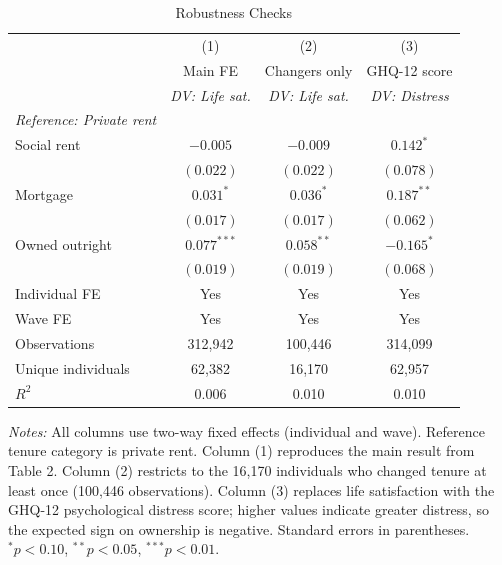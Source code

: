 \documentclass[12pt,a4paper]{article}
\begin{document}
\begin{table}[H]
\centering
\caption{Robustness Checks}
\label{tab:robust}
\begin{threeparttable}
\begin{tabular}{lccc}
\toprule
 & (1) & (2) & (3) \\
 & Main FE & Changers only & GHQ-12 score \\
 & \textit{DV: Life sat.} & \textit{DV: Life sat.} & \textit{DV: Distress} \\
\midrule
\textit{Reference: Private rent} & & & \\[0.3em]
Social rent
  & $-0.005$      & $-0.009$      & $0.142^{*}$  \\
  & $(0.022)$     & $(0.022)$     & $(0.078)$    \\[0.3em]
Mortgage
  & $0.031^{*}$   & $0.036^{*}$   & $0.187^{**}$ \\
  & $(0.017)$     & $(0.017)$     & $(0.062)$    \\[0.3em]
Owned outright
  & $0.077^{***}$ & $0.058^{**}$  & $-0.165^{*}$ \\
  & $(0.019)$     & $(0.019)$     & $(0.068)$    \\[0.5em]
Individual FE      & Yes     & Yes     & Yes     \\
Wave FE            & Yes     & Yes     & Yes     \\
\midrule
Observations       & 312{,}942 & 100{,}446 & 314{,}099 \\
Unique individuals & 62{,}382  & 16{,}170  & 62{,}957  \\
$R^{2}$            & 0.006     & 0.010     & 0.010     \\
\bottomrule
\end{tabular}
\begin{tablenotes}
\small
\item \textit{Notes:} All columns use two-way fixed effects (individual
and wave). Reference tenure category is private rent. Column (1)
reproduces the main result from Table 2. Column (2) restricts to the
16,170 individuals who changed tenure at least once (100,446
observations). Column (3) replaces life satisfaction with the GHQ-12
psychological distress score; higher values indicate greater distress,
so the expected sign on ownership is negative. Standard errors in
parentheses.
$^{*}p < 0.10$, $^{**}p < 0.05$, $^{***}p < 0.01$.
\end{tablenotes}
\end{threeparttable}
\end{table}
\end{document}
